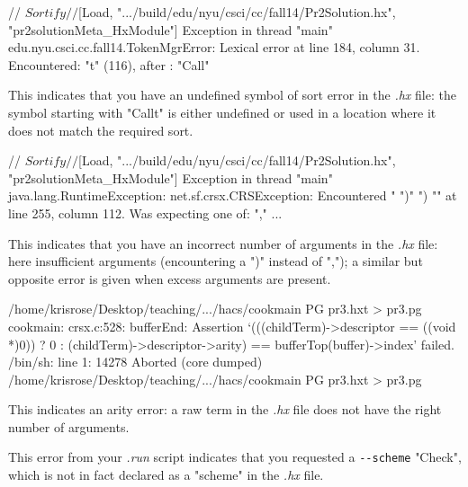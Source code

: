 \documentclass[11pt]{article} %
\begin{document}
\begin{error}\leavevmode
\begin{code}
// $Sortify
// $[Load, ".../build/edu/nyu/csci/cc/fall14/Pr2Solution.hx", "pr2solutionMeta_HxModule"]
Exception in thread "main" edu.nyu.csci.cc.fall14.TokenMgrError:
   Lexical error at line 184, column 31.  Encountered: "t" (116), after : "Call"
\end{code}
This indicates that you have an undefined symbol of sort error in the \emph{.hx} file: the symbol
starting with "Callt" is either undefined or used in a location where it does not match the required
sort.
\end{error}

\begin{error}\leavevmode
\begin{code}
// $Sortify
// $[Load, ".../build/edu/nyu/csci/cc/fall14/Pr2Solution.hx", "pr2solutionMeta_HxModule"]
Exception in thread "main" java.lang.RuntimeException: net.sf.crsx.CRSException:
   Encountered " ")" ") "" at line 255, column 112.
Was expecting one of:
    "," ...
\end{code}
This indicates that you have an incorrect number of arguments in the \emph{.hx} file: here
insufficient arguments (encountering a ")" instead of ","); a similar but opposite error is given
when excess arguments are present.
\end{error}

\begin{error}[]\leavevmode
\begin{code}
/home/krisrose/Desktop/teaching/.../hacs/cookmain PG pr3.hxt > pr3.pg
cookmain: crsx.c:528: bufferEnd: Assertion
   `(((childTerm)->descriptor == ((void *)0)) ? 0 :
        (childTerm)->descriptor->arity) == bufferTop(buffer)->index' failed.
/bin/sh: line 1: 14278 Aborted
  (core dumped) /home/krisrose/Desktop/teaching/.../hacs/cookmain PG pr3.hxt > pr3.pg
\end{code}
  This indicates an arity error: a raw term in the \emph{.hx} file does not have the right number of
  arguments.
\end{error}

\begin{error}[]\leavevmode
\begin{code}
« $Print-Check[
...
»
\end{code}
This error from your \emph{.run} script indicates that you requested a \verb'--scheme' "Check",
which is not in fact declared as a "scheme" in the \emph{.hx} file.
\end{error}
\end{document}
